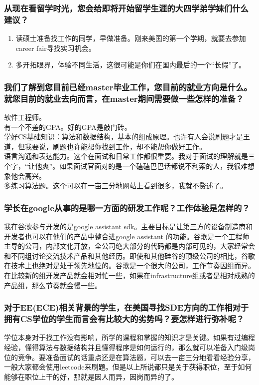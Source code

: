 \documentclass[a4paper,UTF8]{book}
\begin{document}
    \subsubsection*{从现在看留学时光，您会给即将开始留学生涯的大四学弟学妹们什么建议？}
        \begin{enumerate}[itemindent=0pt,itemsep=0pt,parsep=0pt]
            \item 读硕士准备找工作的同学，早做准备。刚来美国的第一个学期，就要去参加career fair寻找实习机会。
            \item 多开拓眼界，体验不同生活，这很可能是你们在国内最后的一个“长假”了。
        \end{enumerate}

    \subsubsection*{我们了解到您目前已经master毕业工作，您目前的就业方向是什么。就您目前的就业去向而言，在master期间需要做一些怎样的准备？}
    软件工程师。\\
    有一个不差的GPA。好的GPA是敲门砖。\\
    学好CS基础知识：算法和数据结构，基本的组成原理。也许有人会说刷题才是王道，但我要说，刷题也许能帮你找到工作，却不能帮你做好工作。\\
    语言沟通和表达能力。这个在面试和日常工作都很重要。我对于面试的理解就是三个字，“让他爽”。如果面试官面对的是一个磕磕巴巴话都说不利索的人，我很难想象他会高兴。\\
    多练习算法题。这个可以在一亩三分地网站上看到很多，我就不赘述了。

    \subsubsection*{学长在google从事的是哪一方面的研发工作呢？工作体验是怎样的？}
    我在谷歌参与开发的是google assistant sdk。主要目标是让第三方的设备制造商和开发者也可以在他们的产品中整合进google assistant 的功能。谷歌是一个工程师主导的公司，内部文化开放，全公司绝大部分的代码都是内部可见的，大家经常会和不同组讨论交流技术产品和其他经历。即使和其他硅谷的顶级公司的相比，谷歌在技术上也绝对是处于领先地位的。谷歌是一个很大的公司，工作节奏因组而异。在比较新的组开发产品就会相对忙一些，如果在infrastructure组或者是相对成熟的产品组，那么节奏就会慢一些。

    \subsubsection*{对于EE(ECE)相关背景的学生，在美国寻找SDE方向的工作相对于拥有CS学位的学生而言会有比较大的劣势吗？要怎样进行弥补呢？}
    学位本身对于找工作没有影响，所学的课程和掌握的知识才是关键。如果有过编程经验，懂得算法与数据结构并且懂得程序是如何运行的，那么就可以准备入门级岗位的竞争。要准备面试的话重点还是在算法题，可以去一亩三分地看看经验分享，一般大家都会使用leetcode来刷题。但是以上所说都只是关于获得职位，至于如何能够在职位上干的好，那就是因人而异，因岗而异的了。
\end{document}
